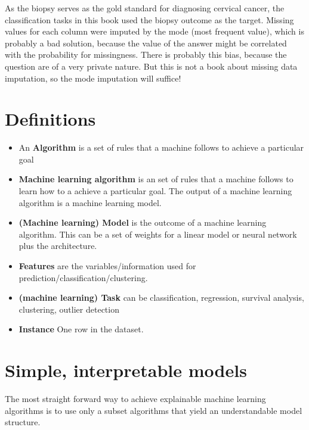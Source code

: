 \documentclass[12pt,]{krantz}
\providecommand{\tightlist}{%
  \setlength{\itemsep}{0pt}\setlength{\parskip}{0pt}}
\theoremstyle{definition}
\theoremstyle{definition}
\theoremstyle{definition}
\theoremstyle{remark}
\begin{document}
As the biopsy serves as the gold standard for diagnosing cervical
cancer, the classification tasks in this book used the biopsy outcome as
the target. Missing values for each column were imputed by the mode
(most frequent value), which is probably a bad solution, because the
value of the answer might be correlated with the probability for
missingness. There is probably this bias, because the question are of a
very private nature. But this is not a book about missing data
imputation, so the mode imputation will suffice!

\hypertarget{htmlwidget-94285ba5c6903b17154e}{}

\citep{fernandes2017transfer}

\chapter{Definitions}\label{definitions}

\begin{itemize}
\tightlist
\item
  An \textbf{Algorithm} is a set of rules that a machine follows to
  achieve a particular goal \citep{algorithm}
\item
  \textbf{Machine learning algorithm} is an set of rules that a machine
  follows to learn how to a achieve a particular goal. The output of a
  machine learning algorithm is a machine learning model.
\item
  \textbf{(Machine learning) Model} is the outcome of a machine learning
  algorithm. This can be a set of weights for a linear model or neural
  network plus the architecture.
\item
  \textbf{Features} are the variables/information used for
  prediction/classification/clustering.
\item
  \textbf{(machine learning) Task} can be classification, regression,
  survival analysis, clustering, outlier detection
\item
  \textbf{Instance} One row in the dataset.
\end{itemize}

\chapter{Simple, interpretable models}\label{simple}

The most straight forward way to achieve explainable machine learning
algorithms is to use only a subset algorithms that yield an
understandable model structure.
\end{document}
